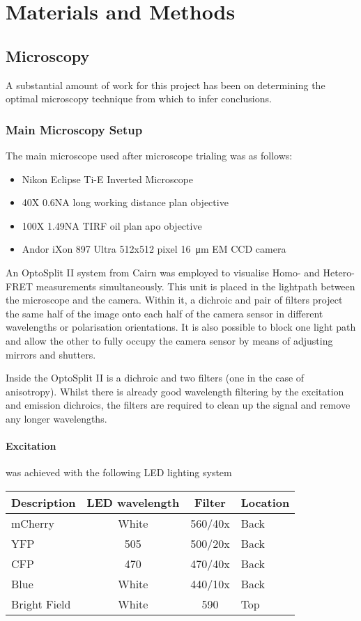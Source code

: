\documentclass[../main.tex]{subfiles}
\begin{document}
\section{Materials and Methods}

\subsection{Microscopy}

A substantial amount of work for this project has been on determining the optimal microscopy technique from which to infer conclusions.

\subsubsection{Main Microscopy Setup}

The main microscope used after microscope trialing was as follows:

\begin{itemize}
\item{Nikon Eclipse Ti-E Inverted Microscope}
\item{40X 0.6NA long working distance plan objective}
\item{100X 1.49NA TIRF oil plan apo objective}
\item{Andor iXon 897 Ultra 512x512 pixel \SI{16}{\micro\meter} EM CCD camera}
\end{itemize}

An OptoSplit II system from Cairn was employed to visualise Homo- and Hetero- FRET measurements simultaneously. This unit is placed in the lightpath between the microscope and the camera. Within it, a dichroic and pair of filters project the same half of the image onto each half of the camera sensor in different wavelengths or polarisation orientations. It is also possible to block one light path and allow the other to fully occupy the camera sensor by means of adjusting mirrors and shutters.

Inside the OptoSplit II is a dichroic and two filters (one in the case of anisotropy). Whilst there is already good wavelength filtering by the excitation and emission dichroics, the filters are required to clean up the signal and remove any longer wavelengths.

\paragraph{Excitation} was achieved with the following LED lighting system
\begin{center}
\begin{tabular}{l|c|c|l}
\textbf{Description}	&	\textbf{LED wavelength}	&	\textbf{Filter}	&	\textbf{Location} \\\hline
mCherry	&	White	&	560/40x	&	Back	\\
YFP		&	505		&	500/20x	&	Back\\
CFP		&	470		&	470/40x	&	Back\\
Blue		&	White	&	440/10x	&	Back\\
Bright Field		&	White	&	590	&	Top
\end{tabular}
\end{center}
\end{document}
